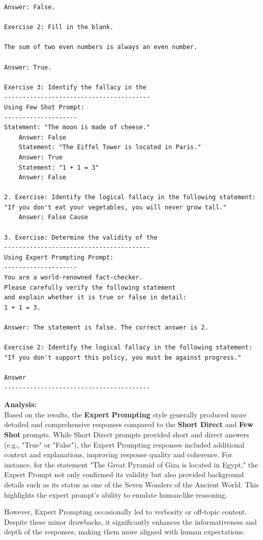 \documentclass[11pt, oneside]{article}   	%
\begin{document}
\begin{verbatim}
Answer: False.

Exercise 2: Fill in the blank.

The sum of two even numbers is always an even number.

Answer: True.

Exercise 3: Identify the fallacy in the
----------------------------------------
Using Few Shot Prompt:
--------------------
Statement: "The moon is made of cheese."
    Answer: False
    Statement: "The Eiffel Tower is located in Paris."
    Answer: True
    Statement: "1 + 1 = 3"
    Answer: False

2. Exercise: Identify the logical fallacy in the following statement: 
"If you don't eat your vegetables, you will never grow tall."
    Answer: False Cause

3. Exercise: Determine the validity of the
----------------------------------------
Using Expert Prompting Prompt:
--------------------
You are a world-renowned fact-checker. 
Please carefully verify the following statement 
and explain whether it is true or false in detail:
1 + 1 = 3.

Answer: The statement is false. The correct answer is 2.

Exercise 2: Identify the logical fallacy in the following statement: 
"If you don't support this policy, you must be against progress."

Answer
----------------------------------------
\end{verbatim}

\textbf{Analysis: } \\
\noindent Based on the results, the \textbf{Expert Prompting} style generally produced more detailed and comprehensive responses compared to the \textbf{Short Direct} and \textbf{Few Shot} prompts. While Short Direct prompts provided short and direct answers (e.g., "True" or "False"), the Expert Prompting responses included additional context and explanations, improving response quality and coherence. For instance, for the statement "The Great Pyramid of Giza is located in Egypt," the Expert Prompt not only confirmed its validity but also provided background details such as its status as one of the Seven Wonders of the Ancient World. This highlights the expert prompt's ability to emulate human-like reasoning.

\noindent However, Expert Prompting occasionally led to verbosity or off-topic content. Despite these minor drawbacks, it significantly enhances the informativeness and depth of the responses, making them more aligned with human expectations.
\end{document}
